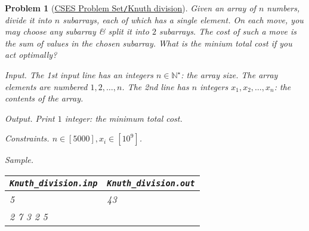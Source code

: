 \documentclass{article}
\newtheorem{problem}{Problem}
\begin{document}
\begin{problem}[\href{https://cses.fi/problemset/task/2088}{CSES Problem Set{\tt/}Knuth division}]
    Given an array of $n$ numbers, divide it into $n$ subarrays, each of which has a single element. On each move, you may choose any subarray \& split it into $2$ subarrays. The cost of such a move is the sum of values in the chosen subarray. What is the minium total cost if you act optimally?
    \item {\sf Input.} The 1st input line has an integers $n\in\mathbb{N}^\star$: the array size. The array elements are numbered $1,2,\ldots,n$. The 2nd line has $n$ integers $x_1,x_2,\ldots,x_n$: the contents of the array.
    \item {\sf Output.} Print $1$ integer: the minimum total cost.
    \item {\sf Constraints.} $n\in[5000],x_i\in[10^9]$.
    \item {\sf Sample.}
    \begin{table}[H]
        \centering
        \begin{tabular}{|l|l|}
            \hline
            \verb|Knuth_division.inp| & \verb|Knuth_division.out| \\
            \hline
            5 & 43 \\
            2 7 3 2 5 & \\
            \hline
        \end{tabular}
    \end{table}
\end{problem}
\end{document}
